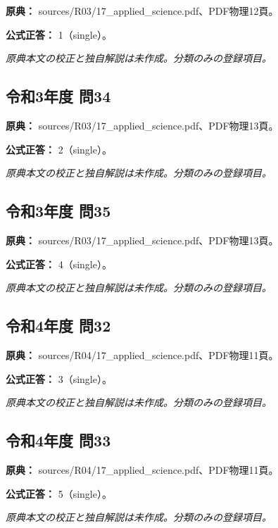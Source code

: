 \noindent\textbf{原典：} sources/R03/17\_applied\_science.pdf、PDF物理12頁。

\textbf{公式正答：} 1（single）。

\par\textit{原典本文の校正と独自解説は未作成。分類のみの登録項目。}

\subsection{令和3年度 問34}
\label{q:r03-reg-applied-34}

\noindent\textbf{原典：} sources/R03/17\_applied\_science.pdf、PDF物理13頁。

\textbf{公式正答：} 2（single）。

\par\textit{原典本文の校正と独自解説は未作成。分類のみの登録項目。}

\subsection{令和3年度 問35}
\label{q:r03-reg-applied-35}

\noindent\textbf{原典：} sources/R03/17\_applied\_science.pdf、PDF物理13頁。

\textbf{公式正答：} 4（single）。

\par\textit{原典本文の校正と独自解説は未作成。分類のみの登録項目。}

\subsection{令和4年度 問32}
\label{q:r04-reg-applied-32}

\noindent\textbf{原典：} sources/R04/17\_applied\_science.pdf、PDF物理11頁。

\textbf{公式正答：} 3（single）。

\par\textit{原典本文の校正と独自解説は未作成。分類のみの登録項目。}

\subsection{令和4年度 問33}
\label{q:r04-reg-applied-33}

\noindent\textbf{原典：} sources/R04/17\_applied\_science.pdf、PDF物理11頁。

\textbf{公式正答：} 5（single）。

\par\textit{原典本文の校正と独自解説は未作成。分類のみの登録項目。}

